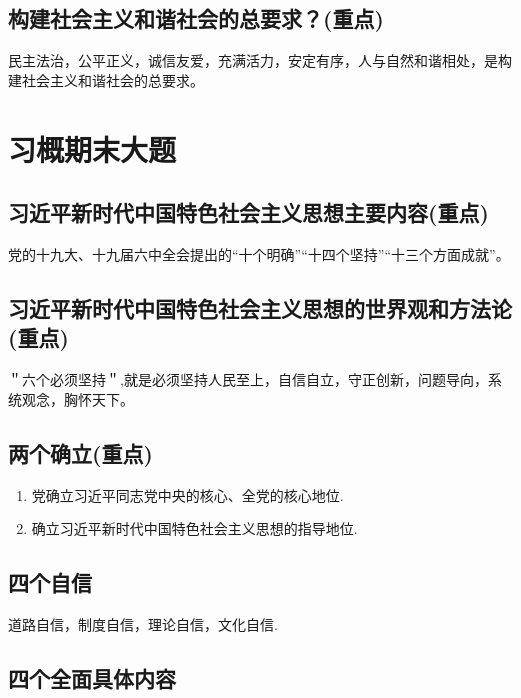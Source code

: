 \documentclass[12pt, a4paper, oneside]{ctexbook}
\begin{document}
\section{构建社会主义和谐社会的总要求？(重点)}

民主法治，公平正义，诚信友爱，充满活力，安定有序，人与自然和谐相处，是构建社会主义和谐社会的总要求。






\chapter{习概期末大题}

\section{习近平新时代中国特色社会主义思想主要内容(重点)}

党的十九大、十九届六中全会提出的“十个明确”“十四个坚持”“十三个方面成就”。

\section{习近平新时代中国特色社会主义思想的世界观和方法论(重点)}

＂六个必须坚持＂,就是必须坚持人民至上，自信自立，守正创新，问题导向，系统观念，胸怀天下。

\section{两个确立(重点)}

\begin{enumerate}
\item 党确立习近平同志党中央的核心、全党的核心地位. 

\item 确立习近平新时代中国特色社会主义思想的指导地位.
\end{enumerate}

\section{四个自信}

道路自信，制度自信，理论自信，文化自信.


\section{四个全面具体内容}
\end{document}
